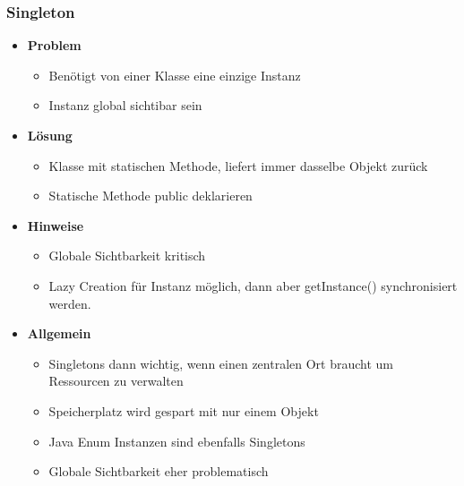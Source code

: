 \documentclass[../ZF_SWEN1.tex]{subfiles}
\begin{document}
\subsubsection{Singleton}
\begin{itemize}
	\item \textbf{Problem}
	\begin{itemize}
		\item Benötigt von einer Klasse eine einzige Instanz
		\item Instanz global sichtibar sein
	\end{itemize}
	\item \textbf{Lösung}
	\begin{itemize}
		\item Klasse mit statischen Methode, liefert immer dasselbe Objekt zurück
		\item Statische Methode public deklarieren
	\end{itemize}
	\item \textbf{Hinweise}
	\begin{itemize}
		\item Globale Sichtbarkeit kritisch
		\item Lazy Creation für Instanz möglich, dann aber getInstance() synchronisiert werden.
	\end{itemize}
	\item \textbf{Allgemein}
	\begin{itemize}
		\item Singletons dann wichtig, wenn einen zentralen Ort braucht um Ressourcen zu verwalten
		\item Speicherplatz wird gespart mit nur einem Objekt
		\item Java Enum Instanzen sind ebenfalls Singletons
		\item Globale Sichtbarkeit eher problematisch
	\end{itemize}
\end{itemize}
\end{document}
